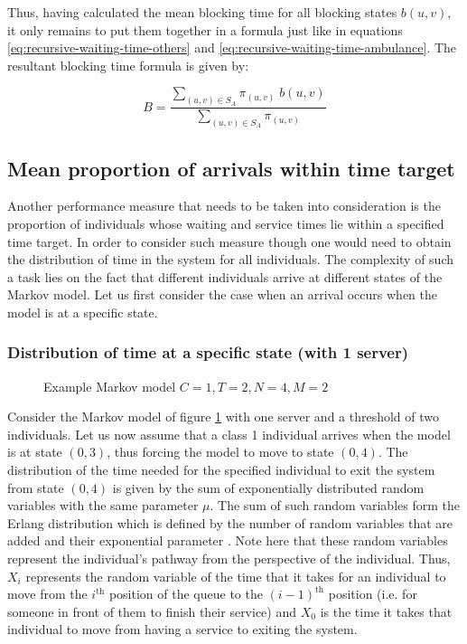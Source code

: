 Thus, having calculated the mean blocking time for all blocking states \(b(u,v)\), 
it only remains to put them together in a formula just like in equations 
\ref{eq:recursive-waiting-time-others} and \ref{eq:recursive-waiting-time-ambulance}.
The resultant blocking time formula is given by:

\begin{equation}\label{eq:algebraic-blocking-time}
    B = \frac{\sum_{(u,v) \in S_A} \pi_{(u,v)} \; b(u,v)}{\sum_{(u,v) \in S_A} 
    \pi_{(u,v)}}
\end{equation}


\subsection{Mean proportion of arrivals within time target}

Another performance measure that needs to be taken into consideration is the 
proportion of individuals whose waiting and service times lie within a specified 
time target.
In order to consider such measure though one would need to obtain the 
distribution of time in the system for all individuals. The complexity of such 
a task lies on the fact that different individuals arrive at different states of
the Markov model. Let us first consider the case when an arrival occurs when the
model is at a specific state.

\subsubsection{Distribution of time at a specific state (with 1 server)}

\begin{figure}[h]
    \centering
    \scalebox{0.75}{}
    \caption{Example Markov model \(C=1, T=2, N=4, M=2\)}
    \label{fig:distribution-of-time-at-specific-state-1-server}
\end{figure}

Consider the Markov model of figure 
\ref{fig:distribution-of-time-at-specific-state-1-server} with one server and a 
threshold of two individuals. 
Let us now assume that a class 1 individual arrives when the model is at state 
\((0,3)\), thus forcing the model to move to state \((0,4)\). 
The distribution of the time needed for the specified individual to exit the 
system from state \((0,4)\) is given by the sum of exponentially distributed 
random variables with the same parameter \(\mu\). 
The sum of such random variables form the Erlang distribution which is defined 
by the number of random variables that are added and their exponential 
parameter \cite{Legros2015}.
Note here that these random variables represent the individual's pathway from 
the perspective of the individual. 
Thus, \(X_i\) represents the random variable of the time that it takes for an
individual to move from the \(i^{\text{th}}\) position of the queue to the 
\((i-1)^{\text{th}}\) position (i.e. for someone in front of them to finish 
their service) and \(X_0\) is the time it takes that individual to move from 
having a service to exiting the system.


